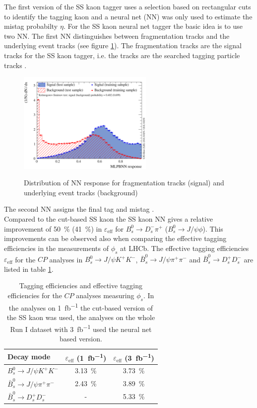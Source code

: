 \documentclass{PoS}
\begin{document}
The first version of the SS kaon tagger uses a selection based on rectangular cuts to identify the tagging kaon and a neural net (NN) was only used to estimate the mistag probabilty $\eta$. For the SS kaon neural net tagger the basic idea is to use two NN. The first NN distinguishes between fragmentation tracks and the underlying event tracks (see figure \ref{fig:nnet}). The fragmentation tracks are the signal tracks for the SS kaon tagger, i.e. the tracks are the searched tagging particle tracks \cite{2}. 
\begin{figure}[htbp]
	\begin{center}
		\includegraphics[width=0.58\textwidth, angle=0]{figs/sskaonNnetfirstNN3.pdf}
		\small{\caption{Distribution of NN response for fragmentation tracks (signal) and underlying event tracks (background) \cite{2}}}
		\label{fig:nnet}
	\end{center}
\end{figure}
The second NN assigns the final tag and mistag \cite{13}.\\ 
Compared to the cut-based SS kaon the SS kaon NN gives a relative improvement of \SI{50}{\%} (\SI{41}{\%}) in $\varepsilon_\text{eff}$ for $B_s^0\to D_s^-\pi^+$ ($B_s^0\to J\!/\!\psi\phi$). This improvements can be observed also when comparing the effective tagging efficiencies in the measurements of $\phi_s$ at LHCb. The effective tagging efficiencies $\varepsilon_\text{eff}$ for the $C\!P$ analyses in \mbox{$B_s^0\to J\!/\!\psi K^+K^-$}, $\bar{B}_s^0\to J\!/\!\psi \pi^+\pi^-$ and $\bar{B}_s^0\to D_s^+D_s^-$ are listed in table \ref{tab:phis}.
\begin{table}[htbp]
  \centering
  \begin{tabular}{lcc}
  \toprule
Decay mode & $\varepsilon_\text{eff}$ (\SI{1}{fb^{-1}}) & $\varepsilon_\text{eff}$ (\SI{3}{fb^{-1}}) \\
  \midrule
  $B_s^0\to J\!/\!\psi K^+K^-$ & \SI{3.13}{\%} \cite{3} & \SI{3.73}{\%} \cite{4} \\ 
  $\bar{B}_s^0\to J\!/\!\psi \pi^+\pi^-$ & \SI{2.43}{\%} \cite{5} & \SI{3.89}{\%} \cite{6} \\
  $\bar{B}_s^0\to D_s^+D_s^-$ & - & \SI{5.33}{\%} \cite{7} \\
  \bottomrule
  \end{tabular}
 \small{ \caption{Tagging efficiencies and effective tagging efficiencies for the $C\!P$ analyses measuring $\phi_s$. In the analyses on \SI{1}{fb^{-1}} the cut-based version of the SS kaon was used, the analyses on the whole Run I dataset with \SI{3}{fb^{-1}} used the neural net based version. }}
  \label{tab:phis}
\end{table} 
\end{document}
